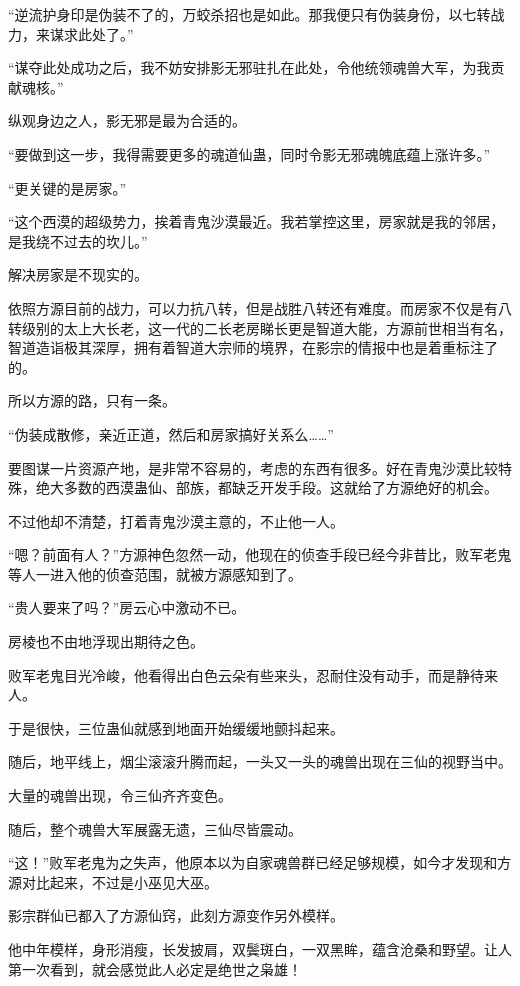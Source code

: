 \begin{this_body}
“逆流护身印是伪装不了的，万蛟杀招也是如此。那我便只有伪装身份，以七转战力，来谋求此处了。”

“谋夺此处成功之后，我不妨安排影无邪驻扎在此处，令他统领魂兽大军，为我贡献魂核。”

纵观身边之人，影无邪是最为合适的。

“要做到这一步，我得需要更多的魂道仙蛊，同时令影无邪魂魄底蕴上涨许多。”

“更关键的是房家。”

“这个西漠的超级势力，挨着青鬼沙漠最近。我若掌控这里，房家就是我的邻居，是我绕不过去的坎儿。”

解决房家是不现实的。

依照方源目前的战力，可以力抗八转，但是战胜八转还有难度。而房家不仅是有八转级别的太上大长老，这一代的二长老房睇长更是智道大能，方源前世相当有名，智道造诣极其深厚，拥有着智道大宗师的境界，在影宗的情报中也是着重标注了的。

所以方源的路，只有一条。

“伪装成散修，亲近正道，然后和房家搞好关系么……”

要图谋一片资源产地，是非常不容易的，考虑的东西有很多。好在青鬼沙漠比较特殊，绝大多数的西漠蛊仙、部族，都缺乏开发手段。这就给了方源绝好的机会。

不过他却不清楚，打着青鬼沙漠主意的，不止他一人。

“嗯？前面有人？”方源神色忽然一动，他现在的侦查手段已经今非昔比，败军老鬼等人一进入他的侦查范围，就被方源感知到了。

“贵人要来了吗？”房云心中激动不已。

房棱也不由地浮现出期待之色。

败军老鬼目光冷峻，他看得出白色云朵有些来头，忍耐住没有动手，而是静待来人。

于是很快，三位蛊仙就感到地面开始缓缓地颤抖起来。

随后，地平线上，烟尘滚滚升腾而起，一头又一头的魂兽出现在三仙的视野当中。

大量的魂兽出现，令三仙齐齐变色。

随后，整个魂兽大军展露无遗，三仙尽皆震动。

“这！”败军老鬼为之失声，他原本以为自家魂兽群已经足够规模，如今才发现和方源对比起来，不过是小巫见大巫。

影宗群仙已都入了方源仙窍，此刻方源变作另外模样。

他中年模样，身形消瘦，长发披肩，双鬓斑白，一双黑眸，蕴含沧桑和野望。让人第一次看到，就会感觉此人必定是绝世之枭雄！


\end{this_body}
